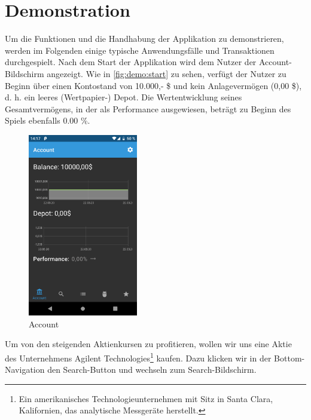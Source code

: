 \documentclass[a4paper]{article}
\begin{document}
\section{Demonstration}
\label{sec:demo}
Um die Funktionen und die Handhabung der Applikation zu demonstrieren, werden im Folgenden einige typische Anwendungsfälle und Transaktionen durchgespielt. Nach dem Start der Applikation wird dem Nutzer der Account-Bildschirm angezeigt. Wie in \autoref{fig:demo:start} zu sehen, verfügt der Nutzer zu Beginn über einen Kontostand von 10.000,- \$ und kein Anlagevermögen (0,00 \$), d. h. ein leeres (Wertpapier-) Depot. Die Wertentwicklung seines Gesamtvermögens, in der als Performance ausgewiesen, beträgt zu Beginn des Spiels ebenfalls 0.00 \%.

\begin{figure}[H]
	\centering
	\includegraphics[width=.5\textwidth,height=8cm,keepaspectratio]{./images/demo/start.png}
	\caption{Account}
	\label{fig:demo:start}
\end{figure}

 Um von den steigenden Aktienkursen zu profitieren, wollen wir uns eine Aktie des Unternehmens Agilent Technologies\footnote{Ein amerikanisches Technologieunternehmen mit Sitz in Santa Clara, Kalifornien, das analytische Messgeräte herstellt.} kaufen. Dazu klicken wir in der Bottom-Navigation den Search-Button und wechseln zum Search-Bildschirm.
\end{document}
